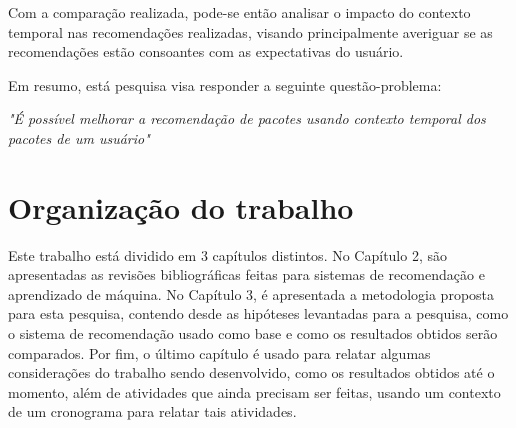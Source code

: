 Com a comparação realizada, pode-se então analisar o impacto do contexto
temporal nas recomendações realizadas, visando principalmente averiguar se as
recomendações estão consoantes com as expectativas do usuário.

Em resumo, está pesquisa visa responder a seguinte questão-problema:

\textit{"É possível melhorar a recomendação de pacotes usando contexto temporal
dos pacotes de um usuário"}

\section{Organização do trabalho}

Este trabalho está dividido em 3 capítulos distintos. No Capítulo 2,
são apresentadas as revisões bibliográficas feitas para sistemas de recomendação e aprendizado de máquina.
No Capítulo 3, é apresentada a metodologia proposta para esta pesquisa, contendo desde as hipóteses levantadas para a pesquisa,
 como o sistema de recomendação usado como base e como os resultados obtidos serão comparados. Por fim, o último capítulo é usado para relatar
algumas considerações do trabalho sendo desenvolvido, como os resultados obtidos até o momento, além de atividades que ainda precisam ser feitas,
usando um contexto de um cronograma para relatar tais atividades.
